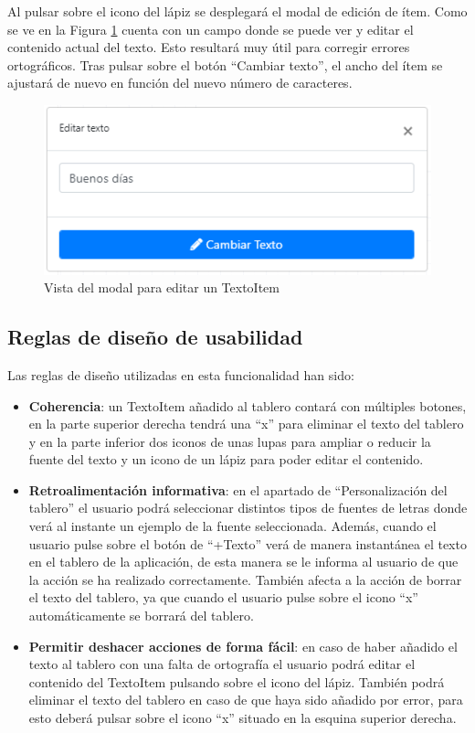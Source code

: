 Al pulsar sobre el icono del lápiz se desplegará el modal de edición de ítem. Como se ve en la Figura \ref{fig:modaleditartexto} cuenta con un campo donde se puede ver y editar el contenido actual del texto. Esto resultará muy útil para corregir errores ortográficos. Tras pulsar sobre el botón “Cambiar texto”, el ancho del ítem se ajustará de nuevo en función del nuevo número de caracteres.

\begin{figure}[h!]
	\centering
	\includegraphics[width=0.7\linewidth]{Imagenes/Bitmap/modalEditarTexto}
	\caption{Vista del modal para editar un TextoItem}
	\label{fig:modaleditartexto}
\end{figure}

\subsection{Reglas de diseño de usabilidad}

 Las reglas de diseño utilizadas en esta funcionalidad han sido:
\begin{itemize}
	\item \textbf{Coherencia}:  un TextoItem añadido al tablero contará con múltiples botones, en la parte superior derecha tendrá una “x” para eliminar el texto del tablero y en la parte inferior dos iconos de unas lupas para ampliar o reducir la fuente del texto y un icono de un lápiz para poder editar el contenido.
	
	\item \textbf{Retroalimentación informativa}: en el apartado de “Personalización del tablero” el usuario podrá seleccionar distintos tipos de fuentes de letras donde verá al instante un ejemplo de la fuente seleccionada. Además, cuando el usuario pulse sobre el botón de “+Texto” verá de manera instantánea el texto en el tablero de la aplicación, de esta manera se le informa al usuario de que la acción se ha realizado correctamente. También afecta a la acción de borrar el texto del tablero, ya que cuando el usuario pulse sobre el icono “x” automáticamente se borrará del tablero.
	
	
	\item \textbf{Permitir deshacer acciones de forma fácil}: en caso de haber añadido el texto al tablero con una falta de ortografía el usuario podrá editar el contenido del TextoItem pulsando sobre el icono del lápiz. También podrá eliminar el texto del tablero en caso de que haya sido añadido por error, para esto deberá pulsar sobre el icono “x” situado en la esquina superior derecha.
	
\end{itemize}



